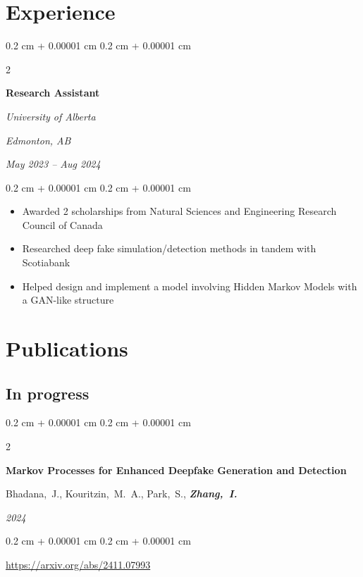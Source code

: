 \documentclass[10pt, letterpaper]{article}
\newenvironment{highlights}{
    \begin{itemize}[
        topsep=0.10 cm,
        parsep=0.10 cm,
        partopsep=0pt,
        itemsep=0pt,
        leftmargin=0.4 cm + 10pt
    ]
}{
    \end{itemize}
} %
\newenvironment{onecolentry}{
    \begin{adjustwidth}{
        0.2 cm + 0.00001 cm
    }{
        0.2 cm + 0.00001 cm
    }
}{
    \end{adjustwidth}
} %
\newenvironment{twocolentry}[2][]{
    \onecolentry
    \def\secondColumn{#2}
    \setcolumnwidth{\fill, 4.5 cm}
    \begin{paracol}{2}
}{
    \switchcolumn \raggedleft \secondColumn
    \end{paracol}
    \endonecolentry
} %
\begin{document}
    
    \section{Experience}

        \begin{twocolentry}{
        \textit{Edmonton, AB}    
            
        \textit{May 2023 – Aug 2024}}
            \textbf{Research Assistant}
            
            \textit{University of Alberta}
        \end{twocolentry}

        \vspace{0.10 cm}
        \begin{onecolentry}
            \begin{highlights}
                \item Awarded 2 scholarships from Natural Sciences and Engineering Research Council of Canada
                \item Researched deep fake simulation/detection methods in tandem with Scotiabank
                \item Helped design and implement a model involving Hidden Markov Models with a GAN-like structure
            \end{highlights}
        \end{onecolentry}


        \vspace{0.2 cm}


    \section{Publications}
    \subsection{In progress}

        \begin{samepage}
            \begin{twocolentry}{
                \textit{2024}
            }
                \textbf{Markov Processes for Enhanced Deepfake Generation and
                Detection}

                \vspace{0.10 cm}

                \mbox{Bhadana, J.}, \mbox{Kouritzin, M. A.}, \mbox{Park, S.}, \mbox{\textbf{\textit{Zhang, I.}}}
            \end{twocolentry}
            \vspace{0.10 cm}
            \begin{onecolentry}
                \url{https://arxiv.org/abs/2411.07993}
            \end{onecolentry}
        \end{samepage}
\end{document}
